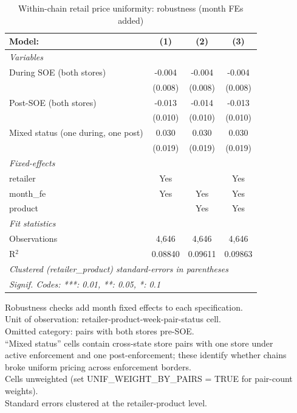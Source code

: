 
\begin{table}[htbp]
   \caption{\label{tab:uniformity_retail_robust} Within-chain retail price uniformity: robustness (month FEs added)}
   \centering
   \begin{tabular}{lccc}
      \tabularnewline \midrule \midrule
      Model:                              & (1)     & (2)     & (3)\\  
      \midrule
      \emph{Variables}\\
      During SOE (both stores)            & -0.004  & -0.004  & -0.004\\   
                                          & (0.008) & (0.008) & (0.008)\\   
      Post-SOE (both stores)              & -0.013  & -0.014  & -0.013\\   
                                          & (0.010) & (0.010) & (0.010)\\   
      Mixed status (one during, one post) & 0.030   & 0.030   & 0.030\\   
                                          & (0.019) & (0.019) & (0.019)\\   
      \midrule
      \emph{Fixed-effects}\\
      retailer                            & Yes     &         & Yes\\  
      month\_fe                           & Yes     & Yes     & Yes\\  
      product                             &         & Yes     & Yes\\  
      \midrule
      \emph{Fit statistics}\\
      Observations                        & 4,646   & 4,646   & 4,646\\  
      R$^2$                               & 0.08840 & 0.09611 & 0.09863\\  
      \midrule \midrule
      \multicolumn{4}{l}{\emph{Clustered (retailer\_product) standard-errors in parentheses}}\\
      \multicolumn{4}{l}{\emph{Signif. Codes: ***: 0.01, **: 0.05, *: 0.1}}\\
   \end{tabular}
   
   \par \raggedright 
   Robustness checks add month fixed effects to each specification.\\
   Unit of observation: retailer-product-week-pair-status cell.\\
   Omitted category: pairs with both stores pre-SOE.\\
   ``Mixed status'' cells contain cross-state store pairs with one store under\\
   active enforcement and one post-enforcement; these identify whether chains\\
   broke uniform pricing across enforcement borders.\\
   Cells unweighted (set UNIF\_WEIGHT\_BY\_PAIRS = TRUE for pair-count weights).\\
   Standard errors clustered at the retailer-product level.
\end{table}



